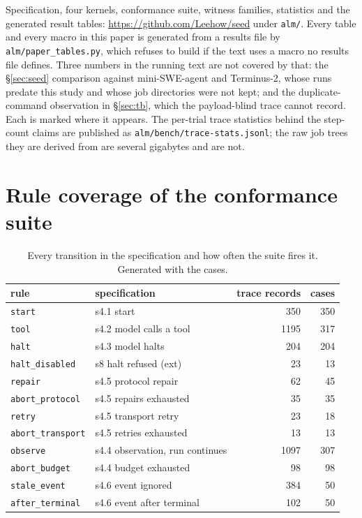 \documentclass[11pt,a4paper]{article}
\begin{document}
Specification, four kernels, conformance suite, witness families, statistics
and the generated result tables: \url{https://github.com/Leehow/seed} under
\texttt{alm/}. Every table and every macro in this paper is generated from a
results file by \texttt{alm/paper\_tables.py}, which refuses to build if the
text uses a macro no results file defines. Three numbers in the running text
are not covered by that: the \S\ref{sec:seed} comparison against
mini-SWE-agent and Terminus-2, whose runs predate this study and whose job
directories were not kept; and the duplicate-command observation in
\S\ref{sec:tb}, which the payload-blind trace cannot record. Each is marked
where it appears. The per-trial trace statistics behind the step-count claims
are published as \texttt{alm/bench/trace-stats.jsonl}; the raw job trees they
are derived from are several gigabytes and are not.

\appendix
\section{Rule coverage of the conformance suite}

\begin{table}[h]\centering\small
\caption{Every transition in the specification and how often the suite fires
it. Generated with the cases.}
\label{tab:coverage}
\begin{tabular}{llrr}
\toprule
rule & specification & trace records & cases \\
\midrule
\texttt{start} & s4.1 start & 350 & 350 \\
\texttt{tool} & s4.2 model calls a tool & 1195 & 317 \\
\texttt{halt} & s4.3 model halts & 204 & 204 \\
\texttt{halt\_disabled} & s8 halt refused (ext) & 23 & 13 \\
\texttt{repair} & s4.5 protocol repair & 62 & 45 \\
\texttt{abort\_protocol} & s4.5 repairs exhausted & 35 & 35 \\
\texttt{retry} & s4.5 transport retry & 23 & 18 \\
\texttt{abort\_transport} & s4.5 retries exhausted & 13 & 13 \\
\texttt{observe} & s4.4 observation, run continues & 1097 & 307 \\
\texttt{abort\_budget} & s4.4 budget exhausted & 98 & 98 \\
\texttt{stale\_event} & s4.6 event ignored & 384 & 50 \\
\texttt{after\_terminal} & s4.6 event after terminal & 102 & 50 \\
\bottomrule
\end{tabular}
\end{table}



\end{document}
